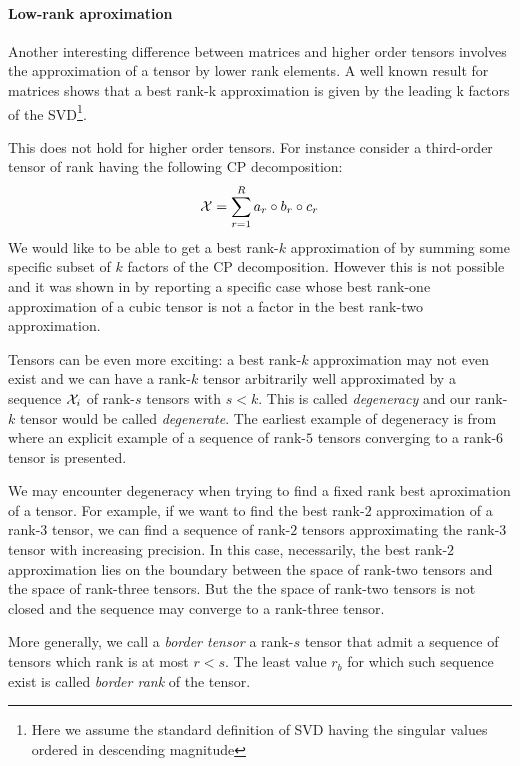 \paragraph{Low-rank aproximation}
Another interesting difference between matrices and higher order tensors involves the approximation of a tensor by lower rank elements.
A well known result for matrices \cite{SVDbestapprox} shows that a best rank-k approximation is given by the leading k factors of the SVD\footnote{Here we assume the standard definition of SVD having the singular values ordered in descending magnitude}.

This does not hold for higher order tensors. For instance consider a third-order tensor of rank \R having the following CP decomposition:
\begin{equation*}
  \mathcal{X} = \sum_{r=1}^R a_r \circ b_r \circ c_r
\end{equation*}
We would like to be able to get a best rank-$k$ approximation of \X by summing some specific subset of $k$ factors of the CP decomposition. However this is not possible and it was shown in \cite{kolda2001orthogonal} by reporting a specific case whose best rank-one approximation of a cubic tensor is not a factor in the best rank-two approximation.

Tensors can be even more exciting: a best rank-$k$ approximation may not even exist and we can have a rank-$k$ tensor \X arbitrarily well approximated by a sequence ${\mathcal{X}_i}$ of rank-$s$ tensors with $s < k$. This is called \emph{degeneracy} and our rank-$k$ tensor would be called \emph{degenerate}.
The earliest example of degeneracy is from \cite{bini1980approximate} where an explicit example of a sequence of rank-$5$ tensors converging to a rank-$6$ tensor is presented.

We may encounter degeneracy when trying to find a fixed rank best aproximation of a tensor. For example, if we want to find the best rank-$2$ approximation of a rank-$3$ tensor, we can find a sequence of rank-$2$ tensors approximating the rank-$3$ tensor with increasing precision. In this case, necessarily, the best rank-$2$ approximation lies on the boundary between the space of rank-two tensors and the space of rank-three tensors. But the the space of rank-two tensors is not closed and the sequence may converge to a rank-three tensor.

More generally, we call a \emph{border tensor} a rank-$s$ tensor that admit a sequence of tensors which rank is at most $r < s$. The least value $r_b$ for which such sequence exist is called \emph{border rank} of the tensor.

